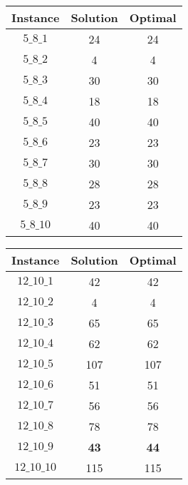 \documentclass[a4paper, 11pt]{article} %
\begin{document}
\begin{center}
\begin{figure}[H]
   \begin{minipage}[c]{.46\linewidth}
      \begin{tabular}{|c|c|c|}
      \hline 
        Instance & Solution & Optimal  \\ \hline
        $5\_8\_1$ & 24  & 24  \\ \hline
        $5\_8\_2$ & 4  & 4  \\ \hline
        $5\_8\_3$ & 30  & 30  \\ \hline
        $5\_8\_4$ & 18  & 18  \\ \hline
        $5\_8\_5$ & 40  & 40  \\ \hline
        $5\_8\_6$ & 23  & 23  \\ \hline
        $5\_8\_7$ & 30  & 30  \\ \hline
        $5\_8\_8$ & 28  & 28  \\ \hline
        $5\_8\_9$ & 23  & 23  \\ \hline
        $5\_8\_10$ & 40 & 40  \\ \hline
      \end{tabular}
   \end{minipage} \hfill
   \begin{minipage}[c]{.46\linewidth}
      \begin{tabular}{|c|c|c|}
      \hline 
        Instance & Solution & Optimal  \\ \hline
        $12\_10\_1$ & 42  & 42  \\ \hline
        $12\_10\_2$ & 4  & 4  \\ \hline
        $12\_10\_3$ & 65  & 65  \\ \hline
        $12\_10\_4$ & 62  & 62  \\ \hline
        $12\_10\_5$ & 107  & 107  \\ \hline
        $12\_10\_6$ & 51  & 51  \\ \hline
        $12\_10\_7$ & 56  & 56  \\ \hline
        $12\_10\_8$ & 78  & 78  \\ \hline
        $12\_10\_9$ & \textbf{43}  & \textbf{44}  \\ \hline
        $12\_10\_10$ & 115 & 115  \\ \hline
      \end{tabular}
   \end{minipage}
\end{figure}


\end{center}
\end{document}
